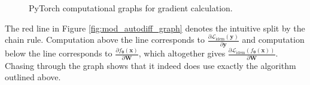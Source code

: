 \documentclass{article}
\theoremstyle{plain}
\theoremstyle{definition}
\theoremstyle{remark}
\newcommand{\vx}{\mathbf{x}}
\newcommand{\vy}{\mathbf{y}}
\newcommand{\vW}{\mathbf{W}}
\newcommand{\vtheta}{\bm{\theta}}
\newcommand{\pd}[2]{\frac{\partial{#1}}{\partial{#2}}}
\begin{document}
\begin{figure}[H]
    \centering
    \caption{PyTorch computational graphs for gradient calculation.}
    \label{fig:comp-graphs}
\end{figure}

The red line in Figure \ref{fig:mod_autodiff_graph} denotes the intuitive split by the chain rule. Computation above the line corresponds to $\pd{\mathcal{L}_{\mathrm{idem}}(\vy)}{\vy}$ and computation below the line corresponds to $\pd{f_{\vtheta}(\vx)}{\vW}$, which altogether gives $\pd{\mathcal{L}_{\mathrm{idem}}(f_{\vtheta}(\vx))}{\vW}$. Chasing through the graph shows that it indeed does use exactly the algorithm outlined above.
\end{document}
